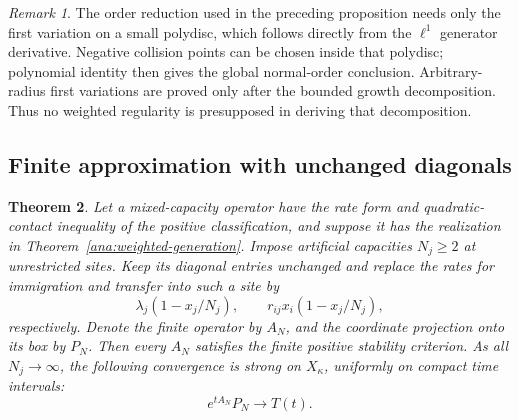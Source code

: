 \documentclass[reqno]{amsart}
\newtheorem{theorem}{Theorem}[section]
\theoremstyle{definition}
\theoremstyle{remark}
\newtheorem{remark}[theorem]{Remark}
\begin{document}
\begin{remark}
The order reduction used in the preceding proposition needs only the
first variation on a small polydisc, which follows directly from the
\(\ell^1\) generator derivative.  Negative collision points can be chosen
inside that polydisc; polynomial identity then gives the global
normal-order conclusion.  Arbitrary-radius first variations are proved
only after the bounded growth decomposition.  Thus no weighted
regularity is presupposed in deriving that decomposition.
\end{remark}

\subsection{Finite approximation with unchanged diagonals}

\begin{theorem}\label{ana:killed-approximation}
Let a mixed-capacity operator have the rate form and quadratic-contact
inequality of the positive classification, and suppose it has the
realization in Theorem~\ref{ana:weighted-generation}.  Impose artificial
capacities \(N_j\ge2\) at unrestricted sites.  Keep its diagonal entries
unchanged and replace the rates for immigration and transfer into such a
site by
\[
 \lambda_j(1-x_j/N_j),\qquad
 r_{ij}x_i(1-x_j/N_j),
\]
respectively.  Denote the finite operator by \(A_N\), and the coordinate
projection onto its box by \(P_N\).  Then every \(A_N\) satisfies the finite
positive stability criterion.  As all \(N_j\to\infty\), the following
convergence is strong on \(X_\kappa\), uniformly on compact time intervals:
\[
 e^{tA_N}P_N\longrightarrow T(t).
\]
\end{theorem}
\end{document}
